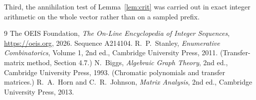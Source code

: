 \documentclass[11pt,a4paper]{article}
\theoremstyle{plain}
\theoremstyle{definition}
\begin{document}
Third, the annihilation test of Lemma~\ref{lem:crit} was carried out in exact integer
arithmetic on the whole vector rather than on a sampled prefix.

\begin{thebibliography}{9}
 The OEIS Foundation, \emph{The On-Line Encyclopedia of Integer
Sequences}, \url{https://oeis.org}, 2026. Sequence A214104.
 R.~P.~Stanley, \emph{Enumerative Combinatorics}, Volume 1, 2nd ed.,
Cambridge University Press, 2011. (Transfer-matrix method, Section 4.7.)
 N.~Biggs, \emph{Algebraic Graph Theory}, 2nd ed., Cambridge University
Press, 1993. (Chromatic polynomials and transfer matrices.)
 R.~A.~Horn and C.~R.~Johnson, \emph{Matrix Analysis}, 2nd ed., Cambridge
University Press, 2013.
\end{thebibliography}
\end{document}
